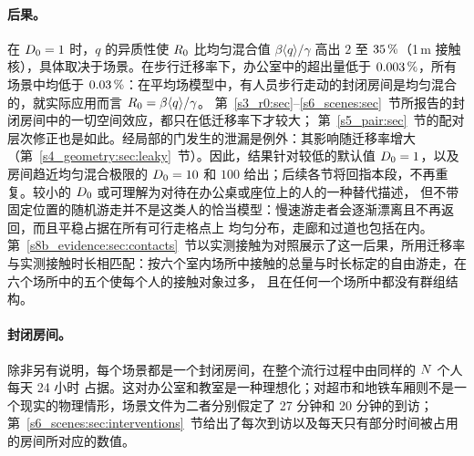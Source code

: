 \paragraph{后果。}在 $D_0=1$ 时，$q$ 的异质性使 $R_0$ 比均匀混合值 $\beta\langle q\rangle/\gamma$ 高出 $2$ 至
$35\,\%$（1\,m 接触核），具体取决于场景。在步行迁移率下，办公室中的超出量低于 $0.003\,\%$，所有场景中均低于
$0.03\,\%$：在平均场模型中，有人员步行走动的封闭房间是均匀混合的，就实际应用而言
$R_0=\beta\langle q\rangle/\gamma$。
第~\ref{s3_r0:sec}--\ref{s6_scenes:sec}~节所报告的封闭房间中的一切空间效应，都只在低迁移率下才较大；
第~\ref{s5_pair:sec}~节的配对层次修正也是如此。经局部的门发生的泄漏是例外：其影响随迁移率增大
（第~\ref{s4_geometry:sec:leaky}~节）。因此，结果针对较低的默认值 $D_0=1$，以及房间趋近均匀混合极限的 $D_0=10$
和 $100$ 给出；后续各节将回指本段，不再重复。较小的 $D_0$ 或可理解为对待在办公桌或座位上的人的一种替代描述，
但不带固定位置的随机游走并不是这类人的恰当模型：慢速游走者会逐渐漂离且不再返回，而且平稳占据在所有可行走格点上
均匀分布，走廊和过道也包括在内。第~\ref{s8b_evidence:sec:contacts}~节以实测接触为对照展示了这一后果，所用迁移率
与实测接触时长相匹配：按六个室内场所中接触的总量与时长标定的自由游走，在六个场所中的五个使每个人的接触对象过多，
且在任何一个场所中都没有群组结构。

\paragraph{封闭房间。}除非另有说明，每个场景都是一个封闭房间，在整个流行过程中由同样的 $N$ 个人每天 24 小时
占据。这对办公室和教室是一种理想化；对超市和地铁车厢则不是一个现实的物理情形，场景文件为二者分别假定了 27 分钟和
20 分钟的到访；
第~\ref{s6_scenes:sec:interventions}~节给出了每次到访以及每天只有部分时间被占用的房间所对应的数值。
